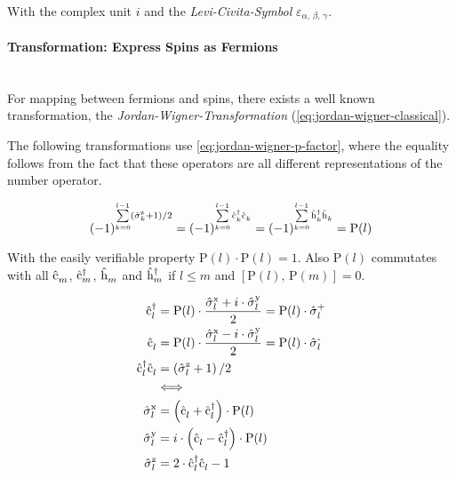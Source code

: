 With the complex unit $i$ and the \emph{Levi-Civita-Symbol} $\varepsilon_{\alpha,\,\beta,\,\gamma}$.

\paragraph{Transformation: Express Spins as Fermions}\makebox{}\\
For mapping between fermions and spins, there exists a well known transformation, the \emph{Jordan-Wigner-Transformation} \cite{jordanWignerBaseCase} (\autoref{eq:jordan-wigner-classical}).

The following transformations use \autoref{eq:jordan-wigner-p-factor}, where the equality follows from the fact that these operators are all different representations of the number operator.

\begin{equation}
    \label{eq:jordan-wigner-p-factor}
\left(-1\right)^{\sum\limits_{k=0}^{l-1} \left( \pauli[k]{z} +1 \right)/2 } = 
\left(-1\right)^{\sum\limits_{k=0}^{l-1}\cop{k}{\dagger}\cop{k}{} } =
\left(-1\right)^{\sum\limits_{k=0}^{l-1}\hop{k}{\dagger}\hop{k}{} } = 
\text{P}(l)
\end{equation}

With the easily verifiable property $\text{P}(l)\cdot \text{P}(l) = 1$. Also $\text{P}(l)$ commutates with all $\hat{\text{c}}^{ }_{m}$, $\hat{\text{c}}^{\dagger }_{m}$, $\hat{\text{h}}^{ }_{m}$ and $\hat{\text{h}}^{\dagger }_{m}$ if $l\leq m$ and $\left[\text{P}(l),\, \text{P}(m)\right] = 0$.

\begin{equation}
    \label{eq:jordan-wigner-classical}
    \begin{split}
        \cop{l}{\dagger} &= \text{P}(l) \cdot \frac{\pauli[l]{x} + i\cdot \pauli[l]{y}}{2} = \text{P}(l) \cdot \pauli[l]{+}\\
        \cop{l}{} &= \text{P}(l) \cdot \frac{\pauli[l]{x} - i\cdot \pauli[l]{y}}{2} = \text{P}(l) \cdot \pauli[l]{-}\\
        \cop{l}{\dagger}\cop{l}{} &= \left( \pauli[l]{z} +1 \right)/2\\
        &\Longleftrightarrow \\
        \pauli[l]{x} &= \left(\cop{l}{} + \cop{l}{\dagger}\right) \cdot \text{P}(l) \\
        \pauli[l]{y} &= i \cdot \left(\cop{l}{} - \cop{l}{\dagger}\right) \cdot \text{P}(l)\\
        \pauli[l]{z} &= 2 \cdot \cop{l}{\dagger}\cop{l}{} -1
    \end{split}
\end{equation}

